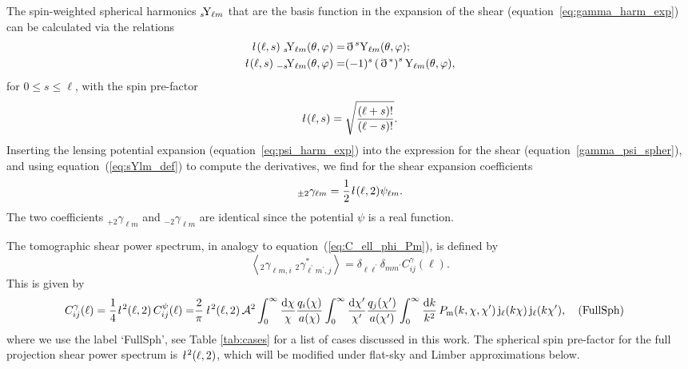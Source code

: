 \documentclass[fleqn,usenatbib]{mnras} %
\newcommand{\ellbar}{\hbox{\it \l}\,}
\newcommand{\pref}{{\cal A}}
\newcommand{\edth}{\,\eth\,}
\newcommand{\Label}[1]{\quad (\mbox{#1})}
\begin{document}
%
The spin-weighted spherical harmonics $_s\!{\rm Y}_{\ell m}$ that are the basis function
in the expansion of the shear (equation~\ref{eq:gamma_harm_exp}) can be calculated via the relations
%
%
\begin{align}
  \ellbar(\ell, s) \; _s\!{\rm Y}_{\ell m}(\theta, \varphi) = & \edth^s {\rm Y}_{\ell m}(\theta, \varphi);
    \nonumber \\
  \ellbar(\ell, s) \; _{-s}\!{\rm Y}_{\ell m}(\theta, \varphi) = & (-1)^s \left(\edth^\ast\right)^s {\rm Y}_{\ell m}(\theta, \varphi),
  \label{eq:sYlm_def} 
\end{align}
%
for $0 \le s \le \ell$, with the spin pre-factor \citep{2012PhRvD..86b3001B}
%
\begin{equation}
  \ellbar(\ell, s) = \sqrt{\frac{(\ell + s)!}{(\ell - s)!}}.
  \label{eq:ellbar}
\end{equation} 
%
Inserting the lensing potential expansion (equation~\ref{eq:psi_harm_exp}) into the
expression for the shear (equation~\ref{gamma_psi_spher}), and using equation~(\ref{eq:sYlm_def})
to compute the derivatives, we find for the shear expansion coefficients
\citep{2000PhRvD..62d3007H,2001astro.ph.11605T}
%
%
\begin{equation}
  _{\pm 2} \gamma_{\ell m} = \frac 1 2 \ellbar(\ell, 2) \psi_{\ell m}.
  \label{eq:gamma_ellm_phi_ellm}
\end{equation}
%
The two coefficients $_{+2} \gamma_{\ell m}$ and $_{-2} \gamma_{\ell m}$ are
identical since the potential $\psi$ is a real function.

The tomographic shear power spectrum, in analogy to equation~(\ref{eq:C_ell_phi_Pm}), is defined by
%
\begin{equation}
  \left\langle _2\gamma^{}_{\ell m, i} \; {}_2\gamma^\ast_{\ell^\prime m^\prime, j} \right\rangle
    = \delta_{\ell \ell^\prime} \delta_{m m^\prime} C^\gamma_{ij}(\ell).
  \label{eq:C_ell_gamma}
\end{equation}
%
This is given by
%
\begin{align}
  C^\gamma_{ij}(\ell) = \frac 1 4 \ellbar^2(\ell, 2) \, C^\psi_{ij}(\ell)
                 = & \frac 2 \pi \, \ellbar^2(\ell, 2) \, \pref^2
                 \int_{0}^\infty \frac{\rm d \chi}{\chi} \frac{q_i(\chi)}{a(\chi)}
                \int_{0}^\infty \frac{\rm d \chi^\prime}{\chi^\prime}
                \frac{q_j(\chi^\prime)}{a(\chi^\prime)}
                \int_0^\infty \frac{{\rm d} k}{k^2} \, P_{\rm m}(k, \chi, \chi^\prime) \,
                {\rm j}_\ell(k \chi) \, {\rm j}_\ell(k \chi^\prime), \Label{FullSph}
  \label{eq:C_ell_full}
\end{align}
%
where we use the label `FullSph', see Table \ref{tab:cases} for a list of cases discussed in this work.
The spherical spin pre-factor for the full projection shear power
spectrum is $\ellbar^2(\ell, 2)$, which will be modified under
flat-sky and Limber approximations below.
\end{document}
